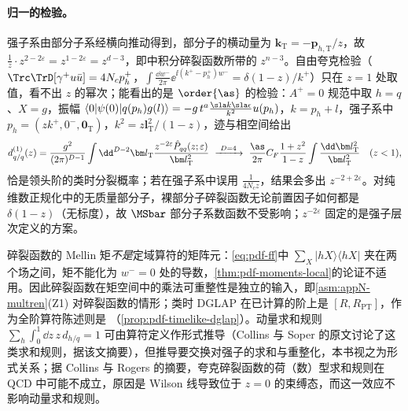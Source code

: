 \paragraph{归一的检验。}
强子系由部分子系经横向推动得到，部分子的横动量为 $\bm k_{\mathrm T}=-\bm p_{h,\mathrm T}/z$，故 $\frac1z\cdot z^{2-2\varepsilon}=z^{1-2\varepsilon}=z^{d-3}$，即\cite[第~12.4~节，式~(12.38)、(12.40)]{Collins2011}中积分碎裂函数所带的 $z^{n-3}$。自由夸克检验（$\Trc\TrD[\gamma^+u\bar u]=4N_cp_h^+$，$\int\frac{\dd w^-}{2\pi}\ee^{\ii(k^+-p_h^+)w^-}=\delta(1-z)/k^+$）只在 $z=1$ 处取值，看不出 $z$ 的幂次；能看出的是 $\order{\as}$ 的检验：$A^+=0$ 规范中取 $h=q$、$X=g$，振幅 $\langle0|\psi(0)|q(p_h)g(l)\rangle=-g\,t^a\frac{\sla k\sla\epsilon}{k^2}u(p_h)$，$k=p_h+l$，强子系中 $p_h=(zk^+,0^-,\bm 0_{\mathrm T})$，$k^2=z\bm l_{\mathrm T}^2/(1-z)$，迹与相空间给出
\[
d^{(1)}_{q/q}(z)=\frac{g^2}{(2\pi)^{D-1}}\int\dd^{D-2}\bm l_{\mathrm T}\frac{z^{-2\varepsilon}\hat P_{qq}(z;\varepsilon)}{\bm l_{\mathrm T}^2}\ \xrightarrow{\ D=4\ }\ \frac{\as}{2\pi}C_F\frac{1+z^2}{1-z}\int\frac{\dd\bm l_{\mathrm T}^2}{\bm l_{\mathrm T}^2}\quad(z<1),
\]
恰是领头阶的类时分裂概率；若在强子系中误用 $\frac1{4N_cz}$，结果会多出 $z^{-2+2\varepsilon}$。对纯维数正规化中的无质量部分子，裸部分子碎裂函数无论前置因子如何都是 $\delta(1-z)$（无标度），故 $\MSbar$ 部分子系数函数不受影响；$z^{-2\varepsilon}$ 固定的是强子层次定义的方案。

\begin{remark}[碎裂函数的乘法可重整性是独立输入]\label{rem:pdf-ff-multren}
碎裂函数的 Mellin 矩\emph{不是}定域算符的矩阵元：\cref{eq:pdf-ff}中 $\sum_X|hX\rangle\langle hX|$ 夹在两个场之间，矩不能化为 $w^-=0$ 处的导数，\cref{thm:pdf-moments-local}的论证不适用。因此碎裂函数在矩空间中的乘法可重整性是独立的输入，即\cref{asm:appN-multren}(Z1) 对碎裂函数的情形；类时 DGLAP 在已计算的阶上是 $[R,R_{\mathrm{PT}}]$，作为全阶算符陈述则是 \tagA（\cref{prop:pdf-timelike-dglap}）。动量求和规则 $\sum_h\int_0^1\dd z\,z\,d_{h/q}=1$ 可由算符定义作形式推导（Collins 与 Soper 的原文讨论了这类求和规则，据该文摘要\cite{CollinsSoper1982a}），但推导要交换对强子的求和与重整化，本书视之为形式关系；据 Collins 与 Rogers 的摘要\cite{Collins:2023cuo}，夸克碎裂函数的荷（数）型求和规则在 QCD 中可能不成立，原因是 Wilson 线导致位于 $z=0$ 的束缚态，而这一效应不影响动量求和规则。
\end{remark}

